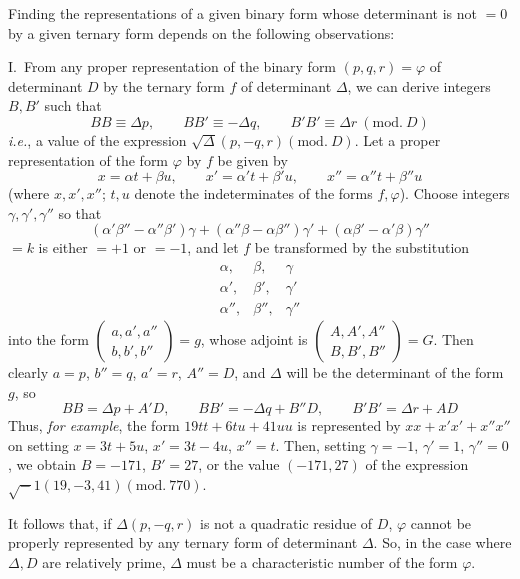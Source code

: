 Finding the representations of a given binary form whose determinant is not
$=0$
by a given ternary form depends on the following observations:

I.\ From any proper representation of the binary form $(p,q,r)=\varphi$ of determinant
$D$ by the ternary form $f$ of determinant $\Delta$, we can derive
integers $B,B'$ such that
\[
BB\equiv\Delta p,\qquad BB'\equiv-\Delta q,\qquad
B'B'\equiv\Delta r\ (\mathrm{mod.}\ D)
\]
\textit{i.e.}, a value of the expression $\surd\Delta(p,\allowbreak -q,\allowbreak r)(\mathrm{mod.}\ D)$.
Let a proper representation of the form $\varphi$ by $f$ be given by
\[
x=\alpha t+\beta u,\qquad x'=\alpha't+\beta'u,\qquad x''=\alpha''t+\beta''u
\]
(where $x,x',x''$; $t,u$ denote the indeterminates of the forms $f,\varphi$).
Choose integers $\gamma,\gamma',\gamma''$ so that
\[
(\alpha'\beta''-\alpha''\beta')\gamma+
(\alpha''\beta-\alpha\beta'')\gamma'+
(\alpha\beta'-\alpha'\beta)\gamma''
\]
$=k$ is either $=+1$ or $=-1$, and let $f$ be transformed by the substitution
\[
\begin{array}{ccc}
\alpha,&\beta,&\gamma\\
\alpha',&\beta',&\gamma'\\
\alpha'',&\beta'',&\gamma''
\end{array}
\]
into the form
$\left(\begin{smallmatrix}a,a',a''\\b,b',b''\end{smallmatrix}\right)=g$,
whose adjoint is
$\left(\begin{smallmatrix}A,A',A''\\B,B',B''\end{smallmatrix}\right)=G$.
Then clearly $a=p$, $b''=q$, $a'=r$, $A''=D$, and $\Delta$ will be the
determinant of the form $g$, so
\[
BB=\Delta p+A'D,\qquad BB'=-\Delta q+B''D,\qquad B'B'=\Delta r+AD
\]
Thus, \textit{for example}, the form $19tt+6tu+41uu$ is represented by $xx+x'x'+x''x''$
on setting $x=3t+5u$, $x'=3t-4u$, $x''=t$. Then, setting $\gamma=-1$, $\gamma'=1$, $\gamma''=0$,
we obtain $B=-171$, $B'=27$, or the value $(-171,27)$ of the expression
$\surd-1(19,\allowbreak -3,\allowbreak 41)(\mathrm{mod.}\ 770)$.

It follows that, if $\Delta(p,-q,r)$ is not a quadratic residue of $D$,
$\varphi$ cannot be properly represented by any ternary form of determinant
$\Delta$. So, in the case where $\Delta,D$ are relatively prime, $\Delta$
must be a characteristic number of the form $\varphi$.

